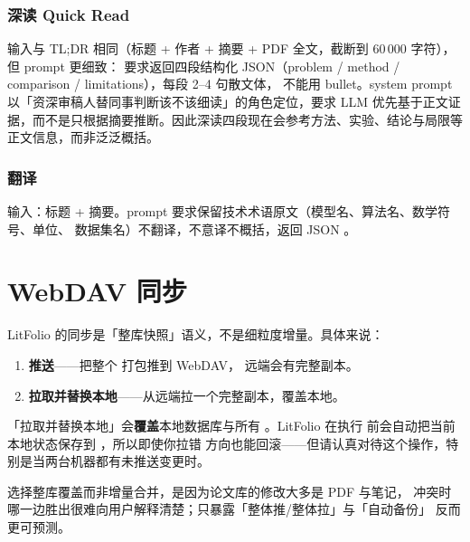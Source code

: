 \subsubsection{深读 Quick Read}

输入与 TL;DR 相同（标题 + 作者 + 摘要 + PDF 全文，截断到 60\,000 字符），但 prompt 更细致：
要求返回四段结构化 JSON（problem / method / comparison / limitations），每段 2–4 句散文体，
不能用 bullet。system prompt 以「资深审稿人替同事判断该不该细读」的角色定位，要求 LLM
优先基于正文证据，而不是只根据摘要推断。因此深读四段现在会参考方法、实验、结论与局限等
正文信息，而非泛泛概括。

\subsubsection{翻译}

输入：标题 + 摘要。prompt 要求保留技术术语原文（模型名、算法名、数学符号、单位、
数据集名）不翻译，不意译不概括，返回 JSON 。

\section{WebDAV 同步}


LitFolio 的同步是「整库快照」语义，不是细粒度增量。具体来说：

\begin{enumerate}
  \item \textbf{推送}——把整个  打包推到 WebDAV，
    远端会有完整副本。
  \item \textbf{拉取并替换本地}——从远端拉一个完整副本，覆盖本地。
\end{enumerate}

\begin{warnbox}
「拉取并替换本地」会\textbf{覆盖}本地数据库与所有 。LitFolio 在执行
前会自动把当前本地状态保存到 ，所以即使你拉错
方向也能回滚——但请认真对待这个操作，特别是当两台机器都有未推送变更时。
\end{warnbox}

选择整库覆盖而非增量合并，是因为论文库的修改大多是 PDF 与笔记，
冲突时哪一边胜出很难向用户解释清楚；只暴露「整体推/整体拉」与「自动备份」
反而更可预测。

